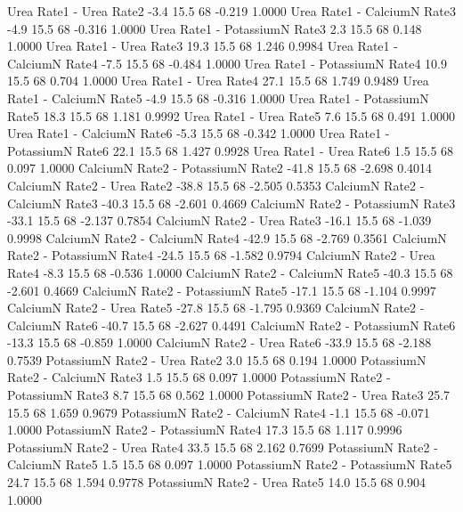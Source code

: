 \documentclass[a4paper,12pt]{article}
\begin{document}
\begin{enumerate}[label=\textbf{\alph*})]
\begin{MyVerbatim}
Urea       Rate1 - Urea Rate2             -3.4 15.5 68  -0.219  1.0000
Urea       Rate1 - CalciumN Rate3         -4.9 15.5 68  -0.316  1.0000
Urea       Rate1 - PotassiumN Rate3        2.3 15.5 68   0.148  1.0000
Urea       Rate1 - Urea Rate3             19.3 15.5 68   1.246  0.9984
Urea       Rate1 - CalciumN Rate4         -7.5 15.5 68  -0.484  1.0000
Urea       Rate1 - PotassiumN Rate4       10.9 15.5 68   0.704  1.0000
Urea       Rate1 - Urea Rate4             27.1 15.5 68   1.749  0.9489
Urea       Rate1 - CalciumN Rate5         -4.9 15.5 68  -0.316  1.0000
Urea       Rate1 - PotassiumN Rate5       18.3 15.5 68   1.181  0.9992
Urea       Rate1 - Urea Rate5              7.6 15.5 68   0.491  1.0000
Urea       Rate1 - CalciumN Rate6         -5.3 15.5 68  -0.342  1.0000
Urea       Rate1 - PotassiumN Rate6       22.1 15.5 68   1.427  0.9928
Urea       Rate1 - Urea Rate6              1.5 15.5 68   0.097  1.0000
CalciumN   Rate2 - PotassiumN Rate2      -41.8 15.5 68  -2.698  0.4014
CalciumN   Rate2 - Urea Rate2            -38.8 15.5 68  -2.505  0.5353
CalciumN   Rate2 - CalciumN Rate3        -40.3 15.5 68  -2.601  0.4669
CalciumN   Rate2 - PotassiumN Rate3      -33.1 15.5 68  -2.137  0.7854
CalciumN   Rate2 - Urea Rate3            -16.1 15.5 68  -1.039  0.9998
CalciumN   Rate2 - CalciumN Rate4        -42.9 15.5 68  -2.769  0.3561
CalciumN   Rate2 - PotassiumN Rate4      -24.5 15.5 68  -1.582  0.9794
CalciumN   Rate2 - Urea Rate4             -8.3 15.5 68  -0.536  1.0000
CalciumN   Rate2 - CalciumN Rate5        -40.3 15.5 68  -2.601  0.4669
CalciumN   Rate2 - PotassiumN Rate5      -17.1 15.5 68  -1.104  0.9997
CalciumN   Rate2 - Urea Rate5            -27.8 15.5 68  -1.795  0.9369
CalciumN   Rate2 - CalciumN Rate6        -40.7 15.5 68  -2.627  0.4491
CalciumN   Rate2 - PotassiumN Rate6      -13.3 15.5 68  -0.859  1.0000
CalciumN   Rate2 - Urea Rate6            -33.9 15.5 68  -2.188  0.7539
PotassiumN Rate2 - Urea Rate2              3.0 15.5 68   0.194  1.0000
PotassiumN Rate2 - CalciumN Rate3          1.5 15.5 68   0.097  1.0000
PotassiumN Rate2 - PotassiumN Rate3        8.7 15.5 68   0.562  1.0000
PotassiumN Rate2 - Urea Rate3             25.7 15.5 68   1.659  0.9679
PotassiumN Rate2 - CalciumN Rate4         -1.1 15.5 68  -0.071  1.0000
PotassiumN Rate2 - PotassiumN Rate4       17.3 15.5 68   1.117  0.9996
PotassiumN Rate2 - Urea Rate4             33.5 15.5 68   2.162  0.7699
PotassiumN Rate2 - CalciumN Rate5          1.5 15.5 68   0.097  1.0000
PotassiumN Rate2 - PotassiumN Rate5       24.7 15.5 68   1.594  0.9778
PotassiumN Rate2 - Urea Rate5             14.0 15.5 68   0.904  1.0000

\end{MyVerbatim}
\end{enumerate}
\end{document}
